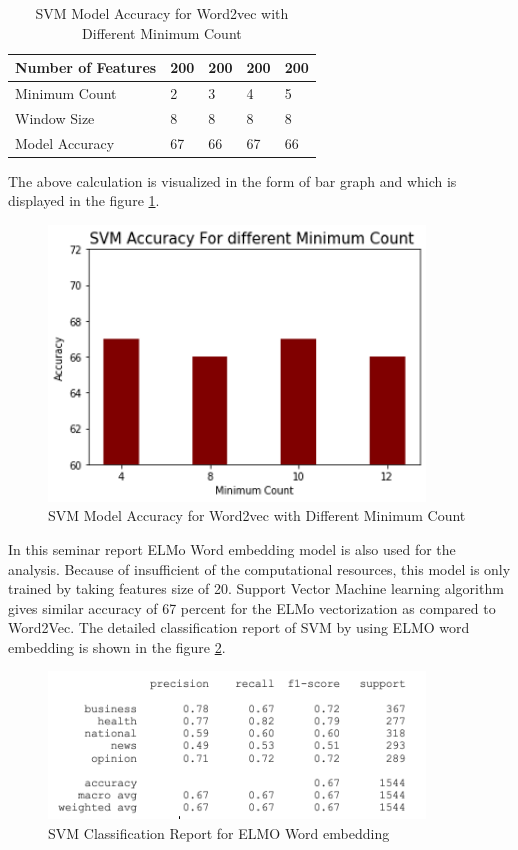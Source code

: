 \begin{center}
\begin{table}[H]
\caption{SVM Model Accuracy for Word2vec with Different Minimum Count}
\label{table: SVM_model_accuracy_diff_minimum_count}
\centering
\begin{tabular}{ |p{4cm}|p{2cm}|p{2cm}|p{2cm}|p{2cm}|  }
 \hline
 Number of Features & 200 &200 &200 &200  \\
 \hline
 Minimum Count   & 2 &3 &4 &5    \\
 \hline
 Window Size &8 &8 &8 &8 \\
 \hline
 Model Accuracy &67 &66 &67 &66 \\
 \hline
\end{tabular}
\end{table}
\end{center}
The above calculation is visualized in the form of bar graph and which is displayed in the figure \ref{fig:bargraph_SVM_model_accuracy_diff_minimum_count}.

\begin{figure}[H]
	\centering 
	\vspace{20pt}\includegraphics[width=10cm]{images/SVM_accuracy_for_different_minimum_count.png}
	\caption{SVM Model Accuracy for Word2vec with Different Minimum Count} 
	\label{fig:bargraph_SVM_model_accuracy_diff_minimum_count}
\end{figure}
In this seminar report ELMo Word embedding model is also used for the analysis. Because of insufficient of the computational resources, this model is only trained by taking features size of 20. Support Vector Machine learning algorithm gives similar accuracy of 67 percent for the ELMo vectorization as compared to Word2Vec. The detailed classification report of SVM by using ELMO word embedding is shown in the figure \ref{fig:SVM_classification_ELMo}.
\begin{figure}[H]
	\centering 
	\vspace{20pt}\includegraphics[width=10cm]{images/ELMO_for_SVM.png}
	\caption{SVM Classification Report for ELMO Word embedding} 
	\label{fig:SVM_classification_ELMo}
\end{figure}

